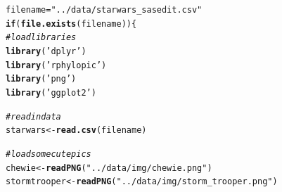 \documentclass{article}\usepackage[]{graphicx}\usepackage[]{color}
\makeatletter
\newcommand{\hlstr}[1]{\textcolor[rgb]{0.192,0.494,0.8}{#1}}%
\newcommand{\hlcom}[1]{\textcolor[rgb]{0.678,0.584,0.686}{\textit{#1}}}%
\newcommand{\hlstd}[1]{\textcolor[rgb]{0.345,0.345,0.345}{#1}}%
\newcommand{\hlkwa}[1]{\textcolor[rgb]{0.161,0.373,0.58}{\textbf{#1}}}%
\newcommand{\hlkwb}[1]{\textcolor[rgb]{0.69,0.353,0.396}{#1}}%
\newcommand{\hlkwd}[1]{\textcolor[rgb]{0.737,0.353,0.396}{\textbf{#1}}}%
\newenvironment{kframe}{%
 \def\at@end@of@kframe{}%
 \ifinner\ifhmode%
  \def\at@end@of@kframe{\end{minipage}}%
  \begin{minipage}{\columnwidth}%
 \fi\fi%
 \def\FrameCommand##1{\hskip\@totalleftmargin \hskip-\fboxsep
 \colorbox{shadecolor}{##1}\hskip-\fboxsep
     \hskip-\linewidth \hskip-\@totalleftmargin \hskip\columnwidth}%
 \MakeFramed {\advance\hsize-\width
   \@totalleftmargin\z@ \linewidth\hsize
   \@setminipage}}%
 {\par\unskip\endMakeFramed%
 \at@end@of@kframe}
\newenvironment{knitrout}{}{} %
\makeatother
\begin{document}
\begin{knitrout}
\color{fgcolor}\begin{kframe}
\begin{alltt}
\hlstd{filename} \hlkwb{=} \hlstr{"../data/starwars_sasedit.csv"}
\hlkwa{if} \hlstd{(}\hlkwd{file.exists}\hlstd{(filename))\{}
  \hlcom{#load libraries}
  \hlkwd{library}\hlstd{(}\hlstr{'dplyr'}\hlstd{)}
  \hlkwd{library}\hlstd{(}\hlstr{'rphylopic'}\hlstd{)}
  \hlkwd{library}\hlstd{(}\hlstr{'png'}\hlstd{)}
  \hlkwd{library}\hlstd{(}\hlstr{'ggplot2'}\hlstd{)}

  \hlcom{#read in data}
  \hlstd{starwars} \hlkwb{<-} \hlkwd{read.csv}\hlstd{(filename)}

  \hlcom{#load some cute pics}
  \hlstd{chewie} \hlkwb{<-} \hlkwd{readPNG}\hlstd{(}\hlstr{"../data/img/chewie.png"}\hlstd{)}
  \hlstd{stormtrooper} \hlkwb{<-} \hlkwd{readPNG}\hlstd{(}\hlstr{"../data/img/storm_trooper.png"}\hlstd{)}



\end{alltt}
\end{kframe}
\end{knitrout}
\end{document}
